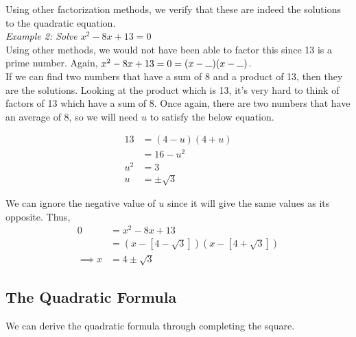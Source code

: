 \documentclass{article}
\newcommand*{\longunderscore}
{
\rule{0.25cm}{0.15mm}
}
\begin{document}
    \noindent Using other factorization methods, we verify that these are indeed the solutions
    to the quadratic equation. \\

    \noindent \color{blue} \textit{Example 2: Solve $x^2-8x+13=0$} \color{black} \\
    Using other methods, we would not have been able to factor this since 13 is a prime number.
    Again, $x^2-8x+13 = 0 = (x-\longunderscore)(x-\longunderscore)$. \\

    \noindent If we can find two numbers that have a sum of 8 and a product of 13, then they
    are the solutions. Looking at the product which is 13, it's very hard to think of factors
    of 13 which have a sum of 8. Once again, there are two numbers that have an average of 8,
    so we will need $u$ to satisfy the below equation.

    \begin{align*}
        13  &= (4-u)(4+u) \\
        &= 16 - u^2 \\
        u^2 &= 3 \\
        u   &= \pm \sqrt{3}
    \end{align*}

    \noindent We can ignore the negative value of $u$ since it will give the same values as its
    opposite. Thus, \\

    \begin{align*}
        0          &= x^2-8x+13 \\
        &= \left(x-[4-\sqrt{3}]\right) \left(x-[4+\sqrt{3}]\right) \\
        \implies x &= 4 \pm \sqrt{3}
    \end{align*}

    \subsection{The Quadratic Formula}

    We can derive the quadratic formula through completing the square. \\
\end{document}
